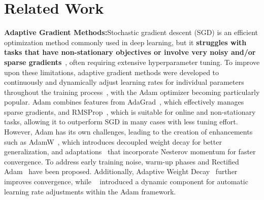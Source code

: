 \section{Related Work}
\label{sec:related_work}


\textbf{Adaptive Gradient Methods:}Stochastic gradient descent (SGD) is an efficient optimization method commonly used in deep learning, but it \textbf{struggles with tasks that have non-stationary objectives or involve very noisy and/or sparse gradients}~\cite{kingma2014adam}, often requiring extensive hyperparameter tuning.
To improve upon these limitations, adaptive gradient methods were developed to continuously and dynamically adjust learning rates for individual parameters throughout the training process~\cite{JMLR:v12:duchi11a, graves2014generatingsequencesrecurrentneural, zeiler2012adadeltaadaptivelearningrate}, with the Adam optimizer becoming particularly popular. Adam combines features from AdaGrad~\cite{ward2020adagrad}, which effectively manages sparse gradients, and RMSProp~\cite{hinton2012neural}, which is suitable for online and non-stationary tasks, allowing it to outperform SGD in many cases with less tuning effort.
However, Adam has its own challenges, leading to the creation of enhancements such as AdamW~\cite{loshchilov2019decoupled}, which introduces decoupled weight decay for better generalization, and adaptations~\cite{dozat.2016} that incorporate Nesterov momentum for faster convergence. To address early training noise, warm-up phases and Rectified Adam~\cite{liu2021variance} have been proposed. Additionally, Adaptive Weight Decay~\cite{ghiasi2023improvingrobustnessadaptiveweight} further improves convergence, while ~\cite{mishchenko2023prodigy} introduced a dynamic component for automatic learning rate adjustments within the Adam framework.


